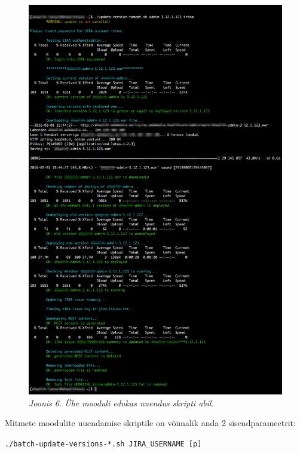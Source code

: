 \documentclass[12pt]{report}
\newcommand{\code}[1]{\texttt{#1}}
\begin{document}
  \begin{figure}[H]
     \begin{center} 
       \includegraphics[width=\textwidth]{screenshots/one-module-successful-update.png}
       \caption*{\textit{Joonis 6. Ühe mooduli edukas uuendus skripti abil.}}
     \end{center}
   \end{figure}
  
  Mitmete moodulite uuendamise skriptile on võimalik anda 2 sisendparameetrit:
  
  \begin{center}
    \small{\code{./batch-update-versions-*.sh JIRA\_USERNAME [p]}}
  \end{center}
  
\end{document}
